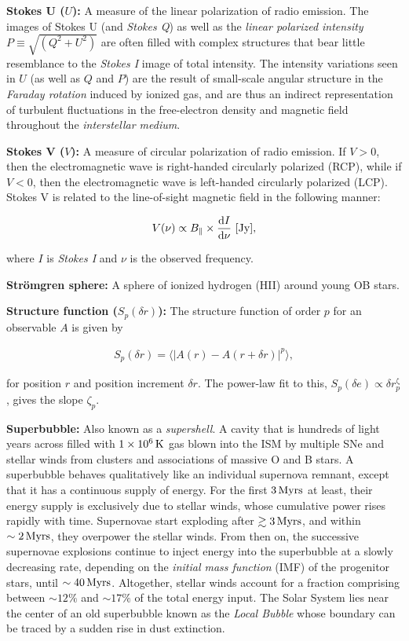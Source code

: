 \documentclass[a4paper,11pt]{article}
\begin{document}
{\noindent}\textbf{Stokes U ($U$):} A measure of the linear polarization of radio emission. The images of Stokes U (and \textit{Stokes Q}) as well as the \textit{linear polarized intensity} $P\equiv\sqrt{(Q^2+U^2)}$ are often filled with complex structures that bear little resemblance to the \textit{Stokes I} image of total intensity. The intensity variations seen in $U$ (as well as $Q$ and $P$) are the result of small-scale angular structure in the \textit{Faraday rotation} induced by ionized gas, and are thus an indirect representation of turbulent fluctuations in the free-electron density and magnetic field throughout the \textit{interstellar medium}.

{\noindent}\textbf{Stokes V ($V$):} A measure of circular polarization of radio emission. If $V>0$, then the electromagnetic wave is right-handed circularly polarized (RCP), while if $V<0$, then the electromagnetic wave is left-handed circularly polarized (LCP). Stokes V is related to the line-of-sight magnetic field in the following manner:

\begin{align*}
    V(\nu) \propto B_\parallel \times \frac{\mathrm{d}I}{\mathrm{d}\nu} ~ [{\rm Jy}],
\end{align*}

{\noindent}where $I$ is \textit{Stokes I} and $\nu$ is the observed frequency.

{\noindent}\textbf{Str\"{o}mgren sphere:} A sphere of ionized hydrogen (HII) around young OB stars.

{\noindent}\textbf{Structure function ($S_p(\delta r)$):} The structure function of order $p$ for an observable $A$ is given by

\begin{align*}
    S_p(\delta r) = \langle\lvert A(r)-A(r+\delta r)\rvert^p\rangle,
\end{align*}

{\noindent}for position $r$ and position increment $\delta r$. The power-law fit to this, $S_p(\delta e)\propto\delta r^{\upzeta}_p$, gives the slope $\zeta_p$.

{\noindent}\textbf{Superbubble:} Also known as a \textit{supershell}. A cavity that is hundreds of light years across filled with $1\times10^6\,{\rm K}$ gas blown into the ISM by multiple SNe and stellar winds from clusters and associations of massive O and B stars. A superbubble behaves qualitatively like an individual supernova remnant, except that it has a continuous supply of energy. For the first $3\,{\rm Myrs}$ at least, their energy supply is exclusively due to stellar winds, whose cumulative power rises rapidly with time. Supernovae start exploding after $\gtrsim3\,{\rm Myrs}$, and within $\sim2\,{\rm Myrs}$, they overpower the stellar winds. From then on, the successive supernovae explosions continue to inject energy into the superbubble at a slowly decreasing rate, depending on the \textit{initial mass function} (IMF) of the progenitor stars, until $\sim40\,{\rm Myrs}$. Altogether, stellar winds account for a fraction comprising between $\sim12\%$ and $\sim17\%$ of the total energy input. The Solar System lies near the center of an old superbubble known as the \textit{Local Bubble} whose boundary can be traced by a sudden rise in dust extinction.
\end{document}
